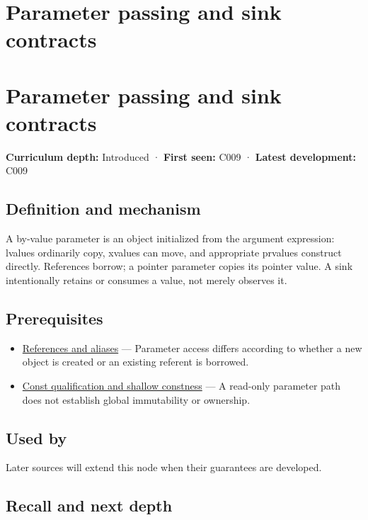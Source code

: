 \hypertarget{appendix-d5908f75721f}{}
\section*{Parameter passing and sink contracts}
\section{Parameter passing and sink contracts}\label{appendix-d5908f75721f-parameter-passing-and-sink-contracts}

\textbf{Curriculum depth:} Introduced · \textbf{First seen:} C009 · \textbf{Latest development:} C009

\subsection{Definition and mechanism}\label{appendix-d5908f75721f-definition-and-mechanism}

A by-value parameter is an object initialized from the argument expression: lvalues ordinarily copy, xvalues can move, and appropriate prvalues construct directly. References borrow; a pointer parameter copies its pointer value. A sink intentionally retains or consumes a value, not merely observes it.

\subsection{Prerequisites}\label{appendix-d5908f75721f-prerequisites}

\begin{itemize}
\tightlist
\item
  \hyperref[appendix-d6d562ca9fbb]{References and aliases} --- Parameter access differs according to whether a new object is created or an existing referent is borrowed.
\item
  \hyperref[appendix-c25d60fed375]{Const qualification and shallow constness} --- A read-only parameter path does not establish global immutability or ownership.
\end{itemize}

\subsection{Used by}\label{appendix-d5908f75721f-used-by}

Later sources will extend this node when their guarantees are developed.

\subsection{Recall and next depth}\label{appendix-d5908f75721f-recall-and-next-depth}

